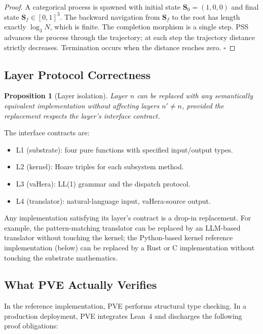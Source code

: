 \documentclass[11pt,twocolumn,a4paper]{article}
\newtheorem{proposition}[theorem]{Proposition}
\newcommand{\Scoord}{\mathbf{S}}
\begin{document}
\begin{proof}
A categorical process is spawned with initial state $\Scoord_0 = (1,0,0)$ and final state $\Scoord_f \in [0,1]^3$. The backward navigation from $\Scoord_f$ to the root has length exactly $\log_3 N$, which is finite. The completion morphism is a single step. PSS advances the process through the trajectory; at each step the trajectory distance strictly decreases. Termination occurs when the distance reaches zero. $\square$
\end{proof}

\subsection{Layer Protocol Correctness}

\begin{proposition}[Layer isolation]
Layer $n$ can be replaced with any semantically equivalent implementation without affecting layers $n' \neq n$, provided the replacement respects the layer's interface contract.
\end{proposition}

The interface contracts are:

\begin{itemize}
\item L1 (substrate): four pure functions with specified input/output types.
\item L2 (kernel): Hoare triples for each subsystem method.
\item L3 (vaHera): LL(1) grammar and the dispatch protocol.
\item L4 (translator): natural-language input, vaHera-source output.
\end{itemize}

Any implementation satisfying its layer's contract is a drop-in replacement. For example, the pattern-matching translator can be replaced by an LLM-based translator without touching the kernel; the Python-based kernel reference implementation (below) can be replaced by a Rust or C implementation without touching the substrate mathematics.

\subsection{What PVE Actually Verifies}

In the reference implementation, PVE performs structural type checking. In a production deployment, PVE integrates Lean~4 and discharges the following proof obligations:
\end{document}
